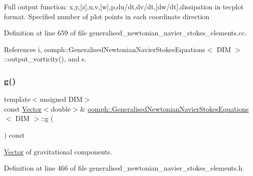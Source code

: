 Full output function\+: x,y,\mbox{[}z\mbox{]},u,v,\mbox{[}w\mbox{]},p,du/dt,dv/dt,\mbox{[}dw/dt\mbox{]},dissipation in tecplot format. Specified number of plot points in each coordinate direction 

Definition at line 659 of file generalised\+\_\+newtonian\+\_\+navier\+\_\+stokes\+\_\+elements.\+cc.



References i, oomph\+::\+Generalised\+Newtonian\+Navier\+Stokes\+Equations$<$ D\+I\+M $>$\+::output\+\_\+vorticity(), and s.

\mbox{\label{classoomph_1_1GeneralisedNewtonianNavierStokesEquations_a32fe95788a212b0ed24e7466c3b73241}} 
\subsubsection{\texorpdfstring{g()}{g()}}
{\footnotesize\ttfamily template$<$unsigned D\+IM$>$ \\
const \hyperlink{classoomph_1_1Vector}{Vector}$<$double$>$\& \hyperlink{classoomph_1_1GeneralisedNewtonianNavierStokesEquations}{oomph\+::\+Generalised\+Newtonian\+Navier\+Stokes\+Equations}$<$ D\+IM $>$\+::g (\begin{DoxyParamCaption}{ }\end{DoxyParamCaption}) const\hspace{0.3cm}{\ttfamily [inline]}}



\hyperlink{classoomph_1_1Vector}{Vector} of gravitational components. 



Definition at line 466 of file generalised\+\_\+newtonian\+\_\+navier\+\_\+stokes\+\_\+elements.\+h.

\mbox{\label{classoomph_1_1GeneralisedNewtonianNavierStokesEquations_a27afa462be9900c2e58caaeb69fcefab}} 
